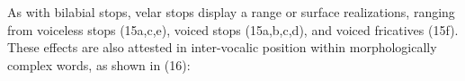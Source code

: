 











As with bilabial stops, velar stops display a range or surface realizations, ranging from voiceless stops (15a,c,e), voiced stops (15a,b,c,d), and voiced fricatives (15f). These effects are also attested in inter-vocalic position within morphologically complex words, as shown in (16):










